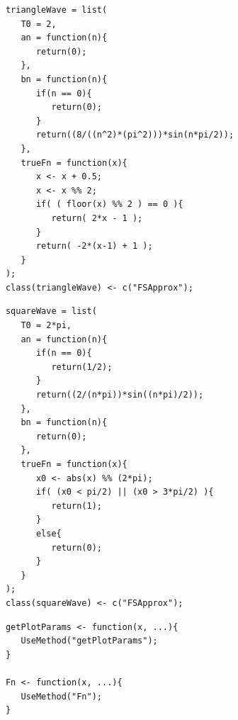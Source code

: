 \documentclass{beamer}
\begin{document}
\begin{frame}[fragile]
   \begin{center}
   \begin{minipage}{100mm}
   \begin{lstlisting}
      triangleWave = list(
         T0 = 2,
         an = function(n){
            return(0);
         },
         bn = function(n){
            if(n == 0){
               return(0);
            }
            return((8/((n^2)*(pi^2)))*sin(n*pi/2));
         },
         trueFn = function(x){
            x <- x + 0.5;
            x <- x %% 2;
            if( ( floor(x) %% 2 ) == 0 ){
               return( 2*x - 1 );
            }
            return( -2*(x-1) + 1 );
         }
      );
      class(triangleWave) <- c("FSApprox");
   \end{lstlisting}
   \end{minipage}
   \end{center}
\end{frame}

\begin{frame}[fragile]
   \begin{center}
   \begin{minipage}{100mm}
   \begin{lstlisting}
      squareWave = list(
         T0 = 2*pi,
         an = function(n){
            if(n == 0){
               return(1/2);
            }
            return((2/(n*pi))*sin((n*pi)/2));
         },
         bn = function(n){
            return(0);
         },
         trueFn = function(x){
            x0 <- abs(x) %% (2*pi);
            if( (x0 < pi/2) || (x0 > 3*pi/2) ){
               return(1);
            }
            else{
               return(0);
            }
         }
      );
      class(squareWave) <- c("FSApprox");
   \end{lstlisting}
   \end{minipage}
   \end{center}
\end{frame}

\begin{frame}[fragile]
   \begin{center}
   \begin{minipage}{100mm}
   \begin{lstlisting}
      getPlotParams <- function(x, ...){
         UseMethod("getPlotParams");
      }

      Fn <- function(x, ...){
         UseMethod("Fn");
      }
   \end{lstlisting}
   \end{minipage}
   \end{center}
\end{frame}
\end{document}
